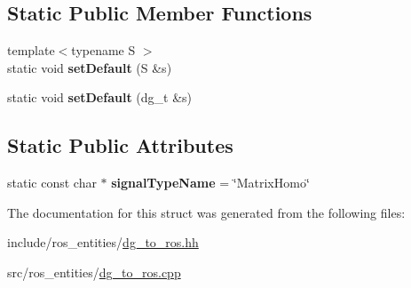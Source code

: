 \subsection*{Static Public Member Functions}
\begin{DoxyCompactItemize}
\item 
\mbox{\label{structdynamic__graph_1_1DgToRos_3_01MatrixHomogeneous_01_4_aff1ef46b1fcaee004c237c428688cde9}} 
{\footnotesize template$<$typename S $>$ }\\static void {\bfseries set\+Default} (S \&s)
\item 
\mbox{\label{structdynamic__graph_1_1DgToRos_3_01MatrixHomogeneous_01_4_a5e5e0b9c45f7a25764ae809c1b83eeb9}} 
static void {\bfseries set\+Default} (dg\+\_\+t \&s)
\end{DoxyCompactItemize}
\subsection*{Static Public Attributes}
\begin{DoxyCompactItemize}
\item 
\mbox{\label{structdynamic__graph_1_1DgToRos_3_01MatrixHomogeneous_01_4_a4b7828ee5ca8c39150cab5be677d0497}} 
static const char $\ast$ {\bfseries signal\+Type\+Name} = \char`\"{}Matrix\+Homo\char`\"{}
\end{DoxyCompactItemize}


The documentation for this struct was generated from the following files\+:\begin{DoxyCompactItemize}
\item 
include/ros\+\_\+entities/\hyperlink{dg__to__ros_8hh}{dg\+\_\+to\+\_\+ros.\+hh}\item 
src/ros\+\_\+entities/\hyperlink{dg__to__ros_8cpp}{dg\+\_\+to\+\_\+ros.\+cpp}\end{DoxyCompactItemize}
